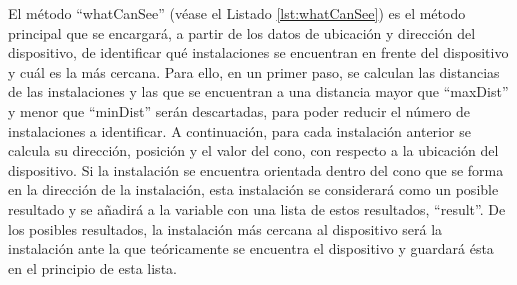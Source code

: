 El método ``whatCanSee'' (véase el Listado \ref{lst:whatCanSee}) es el método principal que se encargará, a partir de los datos de ubicación y dirección del dispositivo, de identificar qué instalaciones se encuentran en frente del dispositivo y cuál es la más cercana. 
Para ello, en un primer paso, se calculan las distancias de las  instalaciones y las que se encuentran a una distancia mayor que ``maxDist'' y menor que ``minDist'' serán descartadas, para poder reducir el número de instalaciones a identificar. 
A continuación, para cada instalación anterior se calcula su dirección, posición y el valor del cono, con respecto a la ubicación del dispositivo. Si la instalación se encuentra orientada dentro del cono que se forma en la dirección de la instalación, esta instalación se considerará como un posible resultado y se añadirá a la variable con una lista de estos resultados, ``result''. 
De los posibles resultados, la instalación más cercana al dispositivo será la instalación ante la que teóricamente se encuentra el dispositivo y guardará ésta en el principio de esta lista.
 

